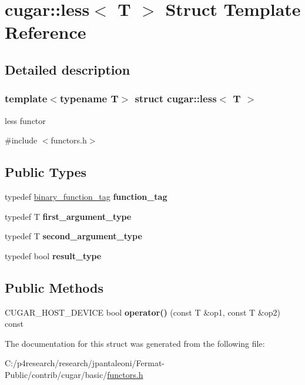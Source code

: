 \hypertarget{structcugar_1_1less}{}\section{cugar\+:\+:less$<$ T $>$ Struct Template Reference}
\label{structcugar_1_1less}


\subsection{Detailed description}
\subsubsection*{template$<$typename T$>$\newline
struct cugar\+::less$<$ T $>$}

less functor 

{\ttfamily \#include $<$functors.\+h$>$}

\subsection*{Public Types}
\begin{DoxyCompactItemize}
\item 
\mbox{\label{structcugar_1_1less_adb47dc880ce43c26f7effd48d45e3c1e}} 
typedef \hyperlink{structcugar_1_1binary__function__tag}{binary\+\_\+function\+\_\+tag} {\bfseries function\+\_\+tag}
\item 
\mbox{\label{structcugar_1_1less_af4f4261c8016a98c93347c01146aabb5}} 
typedef T {\bfseries first\+\_\+argument\+\_\+type}
\item 
\mbox{\label{structcugar_1_1less_a4fc757ff0f4a9e140a535edb884f4677}} 
typedef T {\bfseries second\+\_\+argument\+\_\+type}
\item 
\mbox{\label{structcugar_1_1less_a14f958212b2f50765d5fcc2b6581140f}} 
typedef bool {\bfseries result\+\_\+type}
\end{DoxyCompactItemize}
\subsection*{Public Methods}
\begin{DoxyCompactItemize}
\item 
\mbox{\label{structcugar_1_1less_ad929110b4a8522fd4a54ba109012df24}} 
C\+U\+G\+A\+R\+\_\+\+H\+O\+S\+T\+\_\+\+D\+E\+V\+I\+CE bool {\bfseries operator()} (const T \&op1, const T \&op2) const
\end{DoxyCompactItemize}


The documentation for this struct was generated from the following file\+:\begin{DoxyCompactItemize}
\item 
C\+:/p4research/research/jpantaleoni/\+Fermat-\/\+Public/contrib/cugar/basic/\hyperlink{functors_8h}{functors.\+h}\end{DoxyCompactItemize}
